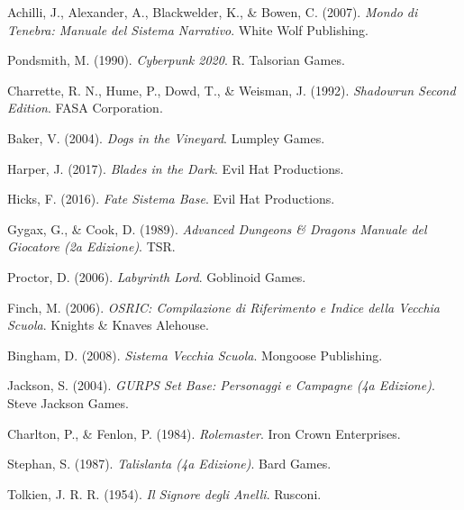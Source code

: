 Achilli, J., Alexander, A., Blackwelder, K., \& Bowen, C. (2007). 
\textit{Mondo di Tenebra: Manuale del Sistema Narrativo}. 
White Wolf Publishing.


Pondsmith, M. (1990).
\textit{Cyberpunk 2020}.
R. Talsorian Games.

Charrette, R. N., Hume, P., Dowd, T., \& Weisman, J. (1992).
\textit{Shadowrun Second Edition}.
FASA Corporation.

Baker, V. (2004).
\textit{Dogs in the Vineyard}.
Lumpley Games.

Harper, J. (2017).
\textit{Blades in the Dark}.
Evil Hat Productions.

Hicks, F. (2016).
\textit{Fate Sistema Base}.
Evil Hat Productions.

Gygax, G., \& Cook, D. (1989).
\textit{Advanced Dungeons \& Dragons Manuale del Giocatore (2a Edizione)}.
TSR.

Proctor, D. (2006).
\textit{Labyrinth Lord}.
Goblinoid Games.

Finch, M. (2006).
\textit{OSRIC: Compilazione di Riferimento e Indice della Vecchia Scuola}.
Knights \& Knaves Alehouse.

Bingham, D. (2008).
\textit{Sistema Vecchia Scuola}.
Mongoose Publishing.

Jackson, S. (2004).
\textit{GURPS Set Base: Personaggi e Campagne (4a Edizione)}.
Steve Jackson Games.

Charlton, P., \& Fenlon, P. (1984).
\textit{Rolemaster}.
Iron Crown Enterprises.

Stephan, S. (1987).
\textit{Talislanta (4a Edizione)}.
Bard Games.

Tolkien, J. R. R. (1954).
\textit{Il Signore degli Anelli}.
Rusconi.

